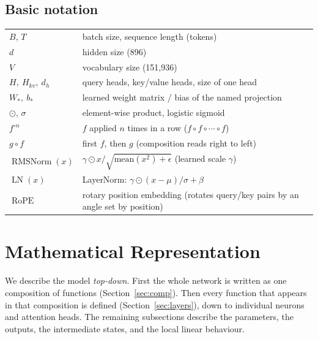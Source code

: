 \documentclass[10pt,a4paper]{article}
\newcommand{\op}[1]{\operatorname{#1}}
\theoremstyle{definition}
\begin{document}
\subsection*{Basic notation}
\begin{tabular}{ll}
\toprule
$B$, $T$ & batch size, sequence length (tokens) \\
$d$ & hidden size (896) \\
$V$ & vocabulary size (151,936) \\
$H,\ H_{kv},\ d_h$ & query heads, key/value heads, size of one head \\
$W_\ast,\ b_\ast$ & learned weight matrix / bias of the named projection \\
$\odot$, $\sigma$ & element-wise product, logistic sigmoid \\
$f^{\circ n}$ & $f$ applied $n$ times in a row ($f\circ f\circ\cdots\circ f$) \\
$g \circ f$ & first $f$, then $g$ (composition reads right to left) \\
$\op{RMSNorm}(x)$ & $\gamma \odot x / \sqrt{\mathrm{mean}(x^2)+\epsilon}$ (learned scale $\gamma$) \\
$\op{LN}(x)$ & LayerNorm: $\gamma\odot(x-\mu)/\sigma + \beta$ \\
$\op{RoPE}$ & rotary position embedding (rotates query/key pairs by an angle set by position) \\
\bottomrule
\end{tabular}
\section{Mathematical Representation}\label{sec:func}
We describe the model \emph{top-down}. First the whole network is written as one composition of functions (Section~\ref{sec:comp}). Then every function that appears in that composition is defined (Section~\ref{sec:layers}), down to individual neurons and attention heads. The remaining subsections describe the parameters, the outputs, the intermediate states, and the local linear behaviour.
\end{document}
